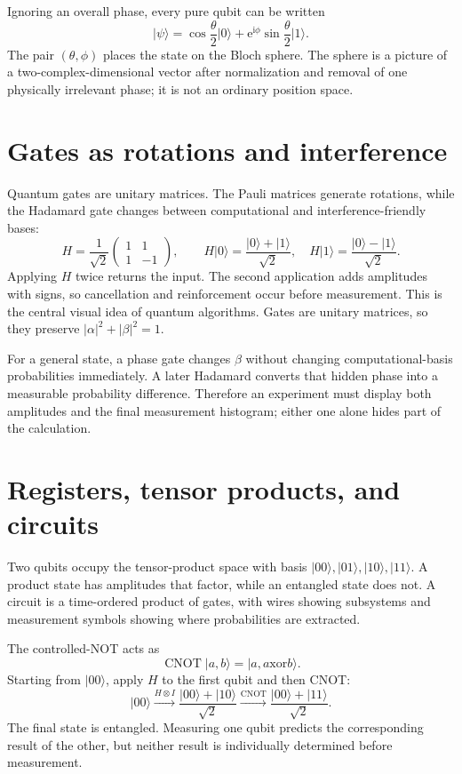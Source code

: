 \documentclass[11pt,oneside]{book}
\newcommand{\ii}{\mathrm{i}}
\newcommand{\ee}{\mathrm{e}}
\newcommand{\ket}[1]{\lvert #1\rangle}
\theoremstyle{reviewstyle}
\begin{document}
Ignoring an overall phase, every pure qubit can be written
\begin{equation}
\ket\psi=\cos\frac\theta2\ket0+\ee^{\ii\phi}\sin\frac\theta2\ket1.
\end{equation}
The pair $(\theta,\phi)$ places the state on the Bloch sphere. The sphere is a picture of a two-complex-dimensional vector after normalization and removal of one physically irrelevant phase; it is not an ordinary position space.

\section{Gates as rotations and interference}
Quantum gates are unitary matrices. The Pauli matrices generate rotations, while the Hadamard gate changes between computational and interference-friendly bases:
\begin{equation}
H=\frac1{\sqrt2}\begin{pmatrix}1&1\\1&-1\end{pmatrix},\qquad
H\ket0=\frac{\ket0+\ket1}{\sqrt2},\quad
H\ket1=\frac{\ket0-\ket1}{\sqrt2}.
\end{equation}
Applying $H$ twice returns the input. The second application adds amplitudes with signs, so cancellation and reinforcement occur before measurement. This is the central visual idea of quantum algorithms. Gates are unitary matrices, so they preserve $|\alpha|^2+|\beta|^2=1$.

For a general state, a phase gate changes $\beta$ without changing computational-basis probabilities immediately. A later Hadamard converts that hidden phase into a measurable probability difference. Therefore an experiment must display both amplitudes and the final measurement histogram; either one alone hides part of the calculation.

\section{Registers, tensor products, and circuits}
Two qubits occupy the tensor-product space with basis $\ket{00},\ket{01},\ket{10},\ket{11}$. A product state has amplitudes that factor, while an entangled state does not. A circuit is a time-ordered product of gates, with wires showing subsystems and measurement symbols showing where probabilities are extracted.

The controlled-NOT acts as
\begin{equation}
\operatorname{CNOT}\ket{a,b}=\ket{a,a\mathbin{\mathrm{xor}}b}.
\end{equation}
Starting from $\ket{00}$, apply $H$ to the first qubit and then CNOT:
\begin{equation}
\ket{00}\xrightarrow{H\otimes I}
\frac{\ket{00}+\ket{10}}{\sqrt2}
\xrightarrow{\operatorname{CNOT}}
\frac{\ket{00}+\ket{11}}{\sqrt2}.
\end{equation}
The final state is entangled. Measuring one qubit predicts the corresponding result of the other, but neither result is individually determined before measurement.
\end{document}
